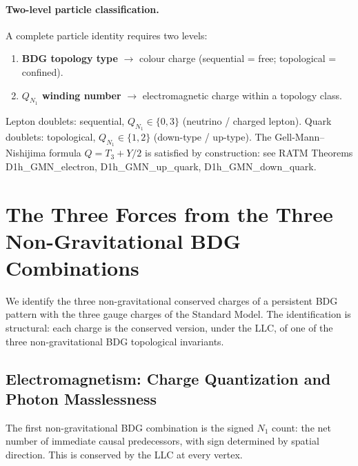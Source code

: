 \documentclass[11pt,a4paper]{article}
\begin{document}
\paragraph{Two-level particle classification.}
A complete particle identity requires two levels:
\begin{enumerate}[noitemsep]
  \item \textbf{BDG topology type} $\to$ colour charge (sequential = free;
    topological = confined).
  \item \textbf{$Q_{N_1}$ winding number} $\to$ electromagnetic charge
    within a topology class.
\end{enumerate}
Lepton doublets: sequential, $Q_{N_1} \in \{0,3\}$ (neutrino / charged lepton).
Quark doublets: topological, $Q_{N_1} \in \{1,2\}$ (down-type / up-type).
The Gell-Mann--Nishijima formula $Q = T_3 + Y/2$ is satisfied by construction:
see RATM Theorems D1h\_GMN\_electron, D1h\_GMN\_up\_quark, D1h\_GMN\_down\_quark.

\section{The Three Forces from the Three Non-Gravitational BDG Combinations}
\label{sec:forces}

We identify the three non-gravitational conserved charges of a persistent
BDG pattern with the three gauge charges of the Standard Model. The
identification is structural: each charge is the conserved version, under
the LLC, of one of the three non-gravitational BDG topological invariants.

\subsection{Electromagnetism: Charge Quantization and Photon Masslessness}

The first non-gravitational BDG combination is the signed $N_1$ count: the
net number of immediate causal predecessors, with sign determined by spatial
direction. This is conserved by the LLC at every vertex.
\end{document}
